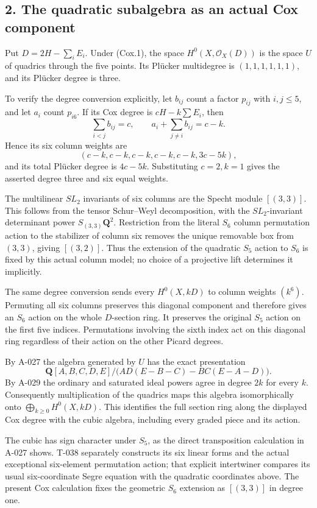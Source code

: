 \documentclass[
  10pt,
]{article}
\begin{document}
\subsection{2. The quadratic subalgebra as an actual Cox
component}\label{the-quadratic-subalgebra-as-an-actual-cox-component}

Put \(D=2H-\sum_iE_i\). Under (Cox.1), the space
\(H^0(X,\mathcal O_X(D))\) is the space \(U\) of quadrics through the
five points. Its Plücker multidegree is \((1,1,1,1,1,1)\), and its
Plücker degree is three.

To verify the degree conversion explicitly, let \(b_{ij}\) count a
factor \(p_{ij}\) with \(i,j\le5\), and let \(a_i\) count \(p_{i6}\). If
its Cox degree is \(cH-k\sum E_i\), then \[
\sum_{i<j}b_{ij}=c,\qquad
a_i+\sum_{j\ne i}b_{ij}=c-k.
\] Hence its six column weights are \[
(c-k,c-k,c-k,c-k,c-k,3c-5k),
\] and its total Plücker degree is \(4c-5k\). Substituting \(c=2,k=1\)
gives the asserted degree three and six equal weights.

The multilinear \(SL_2\) invariants of six columns are the Specht module
\([(3,3)]\). This follows from the tensor Schur--Weyl decomposition,
with the \(SL_2\)-invariant determinant power \(S_{(3,3)}\mathbf Q^2\).
Restriction from the literal \(S_6\) column permutation action to the
stabilizer of column six removes the unique removable box from
\((3,3)\), giving \([(3,2)]\). Thus the extension of the quadratic
\(S_5\) action to \(S_6\) is fixed by this actual column model; no
choice of a projective lift determines it implicitly.

The same degree conversion sends every \(H^0(X,kD)\) to column weights
\((k^6)\). Permuting all six columns preserves this diagonal component
and therefore gives an \(S_6\) action on the whole \(D\)-section ring.
It preserves the original \(S_5\) action on the first five indices.
Permutations involving the sixth index act on this diagonal ring
regardless of their action on the other Picard degrees.

By A-027 the algebra generated by \(U\) has the exact presentation \[
\mathbf Q[A,B,C,D,E]/
\bigl(AD(E-B-C)-BC(E-A-D)\bigr).
\] By A-029 the ordinary and saturated ideal powers agree in degree
\(2k\) for every \(k\). Consequently multiplication of the quadrics maps
this algebra isomorphically onto \(\bigoplus_{k\ge0}H^0(X,kD)\). This
identifies the full section ring along the displayed Cox degree with the
cubic algebra, including every graded piece and its action.

The cubic has sign character under \(S_5\), as the direct transposition
calculation in A-027 shows. T-038 separately constructs its six linear
forms and the actual exceptional six-element permutation action; that
explicit intertwiner compares its usual six-coordinate Segre equation
with the quadratic coordinates above. The present Cox calculation fixes
the geometric \(S_6\) extension as \([(3,3)]\) in degree one.
\end{document}
